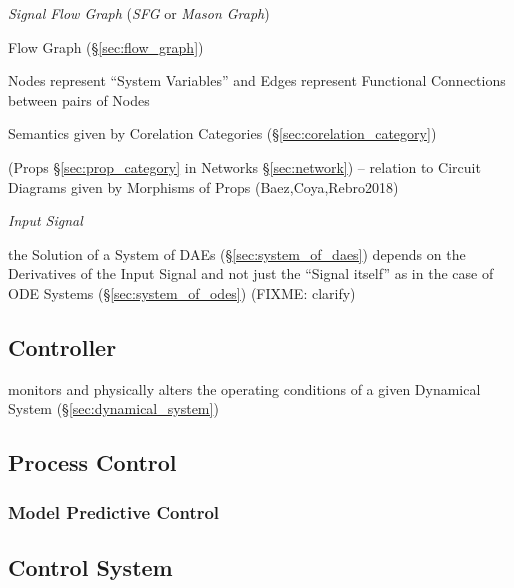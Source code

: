 \emph{Signal Flow Graph} (\emph{SFG} or \emph{Mason Graph})

\fist Flow Graph (\S\ref{sec:flow_graph})

Nodes represent ``System Variables'' and Edges represent Functional
Connections between pairs of Nodes


Semantics given by Corelation Categories
(\S\ref{sec:corelation_category})

(Props \S\ref{sec:prop_category} in Networks \S\ref{sec:network}) -- relation to
Circuit Diagrams given by Morphisms of Props (Baez,Coya,Rebro2018)

\emph{Input Signal}

\fist the Solution of a System of DAEs (\S\ref{sec:system_of_daes}) depends on
the Derivatives of the Input Signal and not just the ``Signal itself'' as in
the case of ODE Systems (\S\ref{sec:system_of_odes})
(FIXME: clarify)



\subsection{Controller}\label{sec:controller}


monitors and physically alters the operating conditions of a given
Dynamical System (\S\ref{sec:dynamical_system})



\subsection{Process Control}\label{sec:process_control}

\subsubsection{Model Predictive Control}\label{sec:model_predictive_control}



\subsection{Control System}\label{sec:control_system}

